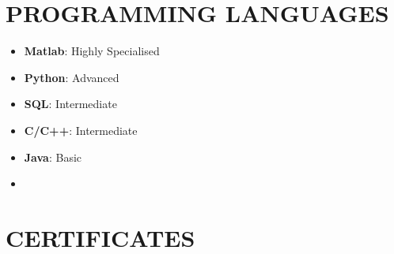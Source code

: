 \documentclass[11 pt,oneside,a4paper,titlepage]{article}
\begin{document}
{\begin{minipage}{11.3cm}
    \section*{{\faCode} PROGRAMMING LANGUAGES}
    \vspace*{-0.5cm}
    \begin{multicols}{2}    
    \begin{itemize}
    \footnotesize
        \item \textbf{Matlab}: Highly Specialised
        \item \textbf{Python}: Advanced
        \item \textbf{SQL}: Intermediate
        \item \textbf{C/C++}: Intermediate
        \item \textbf{Java}: Basic
        \item[\vspace{\fill}]
    \end{itemize}
    \end{multicols}
    
    \section*{{\faCertificate} CERTIFICATES}
    
    \hfill \vline \hfill
    
    \vspace*{0.2cm}
    

\end{minipage}}
\end{document}
